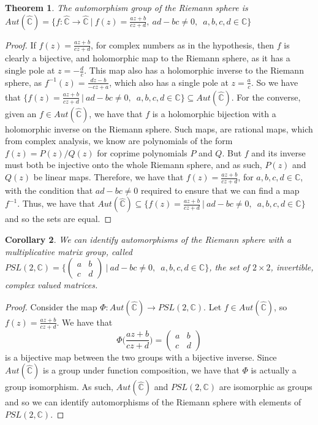 \documentclass[11pt]{report}
\newtheorem{thm}{Theorem}[section]
\newtheorem{cor}[thm]{Corollary}
\theoremstyle{definition}
\begin{document}
\begin{thm}\label{AutSphere}
  The automorphism group of the Riemann sphere is ~\\
  $Aut(\widehat{\mathbb{C}}) = \bigl\{f:\widehat{\mathbb{C}} \rightarrow \widehat{\mathbb{C}} \ \vert \ f(z) = \frac{az+b}{cz+d}, \ ad-bc \neq 0, \enspace a, b, c ,d \in \mathbb{C}\bigr\}$
\end{thm}
\begin{proof}
  If $f(z)=\frac{az+b}{cz+d}$, for complex numbers as in the hypothesis, then $f$ is clearly a bijective, and holomorphic map to the Riemann sphere, as it has a single pole at $z = -\frac{d}{c}$. This map also has a holomorphic inverse to the Riemann sphere, as $f^{-1}(z) = \frac{dz-b}{-cz+a}$, which also has a single pole at $z=\frac{a}{c}$. So we have that $\bigl\{f(z) = \frac{az+b}{cz+d}\ \vert \ ad-bc \neq 0, \enspace a, b, c ,d \in \mathbb{C}\bigr\} \subseteq Aut(\widehat{\mathbb{C}})$. For the converse, given an $f \in Aut(\widehat{\mathbb{C}})$, we have that $f$ is a holomorphic bijection with a holomorphic inverse on the Riemann sphere. Such maps, are rational maps, which from complex analysis, we know are polynomials of the form $f(z)=P(z)/Q(z)$ for coprime polynomials $P$ and $Q$. But $f$ and its inverse must both be injective onto the whole Riemann sphere, and as such, $P(z)$ and $Q(z)$ be linear maps. Therefore, we have that $f(z)=\frac{az+b}{cz+d}$, for $a,b,c,d \in \mathbb{C}$, with the condition that $ad-bc \neq 0$ required to ensure that we can find a map $f^{-1}$. Thus, we have that $Aut(\widehat{\mathbb{C}}) \subseteq \bigl\{f(z) = \frac{az+b}{cz+d}\ \vert \ ad-bc \neq 0, \enspace a, b, c ,d \in \mathbb{C}\bigr\}$ and so the sets are equal.
\end{proof} 
\begin{cor}
  We can identify automorphisms of the Riemann sphere with a multiplicative matrix group, called $PSL(2,\mathbb{C}) = \Bigg\{ \begin{pmatrix} a & b\\ c & d \end{pmatrix} \ \Bigg\vert \ ad-bc \neq 0, \enspace a, b, c ,d \in \mathbb{C}\Bigg\}$, the set of $2\times 2$, invertible, complex valued matrices. 
\end{cor}
\begin{proof}
  Consider the map $\Phi : Aut(\widehat{\mathbb{C}}) \rightarrow PSL(2,\mathbb{C})$. Let $f \in Aut(\widehat{\mathbb{C}})$, so $f(z) = \frac{az+b}{cz+d}$. We have that \[\Phi\Big(\frac{az+b}{cz+d}\Big) = \begin{pmatrix} a & b\\ c & d \end{pmatrix}\] is a bijective map between the two groups with a bijective inverse. Since $Aut(\widehat{\mathbb{C}})$ is a group under function composition, we have that $\Phi$ is actually a group isomorphism. As such, $Aut(\widehat{\mathbb{C}})$ and $PSL(2,\mathbb{C})$ are isomorphic as groups and so we can identify automorphisms of the Riemann sphere with elements of $PSL(2,\mathbb{C})$. 
\end{proof}
\end{document}

